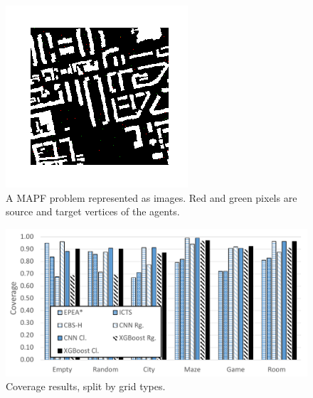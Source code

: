\begin{figure}
\centering
    \includegraphics[width=0.75\linewidth]{images/Berlin_1_256-71-5-label1.png}
    \caption{A MAPF problem represented as images. Red and green pixels are source and target vertices of the agents.}
\label{fig:cnn-image}
\end{figure}


\begin{figure}
    \centering
    \includegraphics[width=\columnwidth]{coverageByMap.pdf}
    \caption{Coverage results, split by grid types.}
    \label{fig:coverageByMap}
\end{figure}